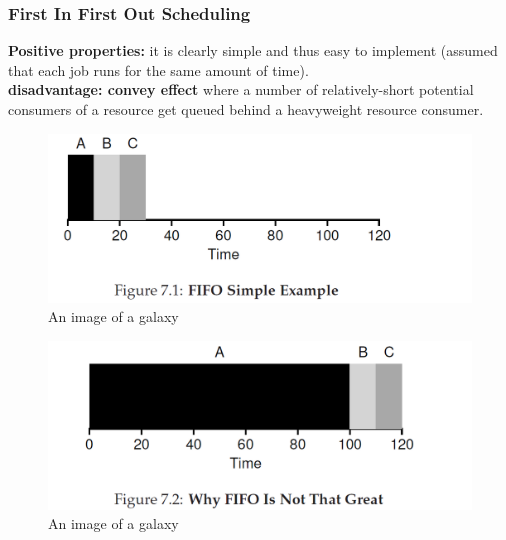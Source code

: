 \documentclass{article}
\begin{document}
\subsubsection{First In First Out Scheduling}
\textbf{Positive properties: }it is clearly simple and thus
easy to implement (assumed that each job runs for the same amount of time).\\
\textbf{disadvantage: convey effect }where
a number of relatively-short potential consumers of a resource get queued behind a heavyweight resource consumer.
\begin{figure}[H]
    \centering
    \includegraphics[width=13cm] {fig7.1.png}
    \caption{An image of a galaxy}
    \label{fig:galaxy}
\end{figure}
\begin{figure}[H]
    \centering
    \includegraphics[width=13cm] {fig7.2.png}
    \caption{An image of a galaxy}
    \label{fig:galaxy}
\end{figure}
\end{document}
